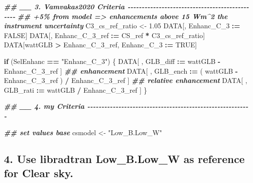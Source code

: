\documentclass[
  10pt,
  a4paper,oneside]{article}
\newenvironment{Shaded}{\begin{snugshade}}{\end{snugshade}}
\newcommand{\ConstantTok}[1]{\textcolor[rgb]{0.56,0.35,0.01}{#1}}
\newcommand{\ControlFlowTok}[1]{\textcolor[rgb]{0.13,0.29,0.53}{\textbf{#1}}}
\newcommand{\DocumentationTok}[1]{\textcolor[rgb]{0.56,0.35,0.01}{\textbf{\textit{#1}}}}
\newcommand{\FloatTok}[1]{\textcolor[rgb]{0.00,0.00,0.81}{#1}}
\newcommand{\NormalTok}[1]{#1}
\newcommand{\OtherTok}[1]{\textcolor[rgb]{0.56,0.35,0.01}{#1}}
\newcommand{\SpecialCharTok}[1]{\textcolor[rgb]{0.81,0.36,0.00}{\textbf{#1}}}
\newcommand{\StringTok}[1]{\textcolor[rgb]{0.31,0.60,0.02}{#1}}
\begin{document}
\begin{Shaded}
\begin{Highlighting}[]
\DocumentationTok{\#\# \_\_ 3. Vamvakas2020  Criteria  {-}{-}{-}{-}{-}{-}{-}{-}{-}{-}{-}{-}{-}{-}{-}{-}{-}{-}{-}{-}{-}{-}{-}{-}{-}{-}{-}{-}{-}{-}{-}{-}{-}{-}{-}{-}{-}{-}{-}{-}{-}{-}{-}{-}{-}{-}{-}}
\DocumentationTok{\#\# +5\% from model =\textgreater{} enhancements above 15 Wm\^{}2 the instrument uncertainty}
\NormalTok{C3\_cs\_ref\_ratio }\OtherTok{\textless{}{-}} \FloatTok{1.05}
\NormalTok{DATA[, Enhanc\_C\_3 }\SpecialCharTok{:=} \ConstantTok{FALSE}\NormalTok{]}
\NormalTok{DATA[, Enhanc\_C\_3\_ref }\SpecialCharTok{:=}\NormalTok{ CS\_ref }\SpecialCharTok{*}\NormalTok{ C3\_cs\_ref\_ratio]}
\NormalTok{DATA[wattGLB }\SpecialCharTok{\textgreater{}}\NormalTok{ Enhanc\_C\_3\_ref,}
\NormalTok{     Enhanc\_C\_3 }\SpecialCharTok{:=} \ConstantTok{TRUE}\NormalTok{]}

\ControlFlowTok{if}\NormalTok{ (SelEnhanc }\SpecialCharTok{==} \StringTok{"Enhanc\_C\_3"}\NormalTok{) \{}
\NormalTok{    DATA[ , GLB\_diff }\SpecialCharTok{:=}\NormalTok{   wattGLB }\SpecialCharTok{{-}}\NormalTok{ Enhanc\_C\_3\_ref                    ] }\DocumentationTok{\#\# enhancement}
\NormalTok{    DATA[ , GLB\_ench }\SpecialCharTok{:=}\NormalTok{ ( wattGLB }\SpecialCharTok{{-}}\NormalTok{ Enhanc\_C\_3\_ref ) }\SpecialCharTok{/}\NormalTok{ Enhanc\_C\_3\_ref ] }\DocumentationTok{\#\# relative enhancement}
\NormalTok{    DATA[ , GLB\_rati }\SpecialCharTok{:=}\NormalTok{   wattGLB }\SpecialCharTok{/}\NormalTok{ Enhanc\_C\_3\_ref                    ]}
\NormalTok{\}}



\DocumentationTok{\#\# \_\_ 4. my Criteria  {-}{-}{-}{-}{-}{-}{-}{-}{-}{-}{-}{-}{-}{-}{-}{-}{-}{-}{-}{-}{-}{-}{-}{-}{-}{-}{-}{-}{-}{-}{-}{-}{-}{-}{-}{-}{-}{-}{-}{-}{-}{-}{-}{-}{-}{-}{-}{-}{-}{-}{-}{-}{-}{-}{-}{-}{-}{-}}

\DocumentationTok{\#\# set values base}
\NormalTok{csmodel }\OtherTok{\textless{}{-}} \StringTok{"Low\_B.Low\_W"}
\end{Highlighting}
\end{Shaded}

\hypertarget{use-libradtran-low_b.low_w-as-reference-for-clear-sky.}{%
\subsection{\texorpdfstring{4. Use libradtran \textbf{Low\_B.Low\_W} as reference for Clear sky.}{4. Use libradtran Low\_B.Low\_W as reference for Clear sky.}}\label{use-libradtran-low_b.low_w-as-reference-for-clear-sky.}}
\end{document}
